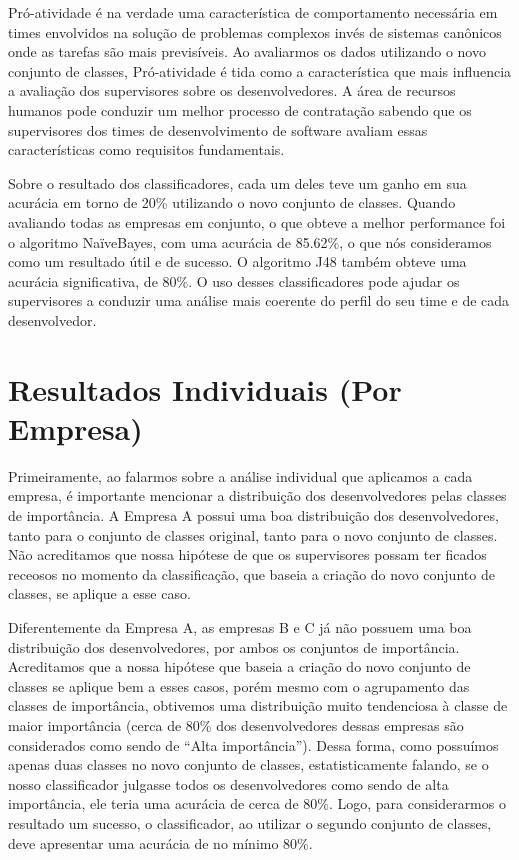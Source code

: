 Pró-atividade é na verdade uma característica de comportamento necessária em times envolvidos na solução de problemas complexos invés de sistemas canônicos onde as tarefas são mais previsíveis. Ao avaliarmos os dados utilizando o novo conjunto de classes, Pró-atividade é tida como a característica que mais influencia a avaliação dos supervisores sobre os desenvolvedores. A área de recursos humanos pode conduzir um melhor processo de contratação sabendo que os supervisores dos times de desenvolvimento de software avaliam essas características como requisitos fundamentais.

Sobre o resultado dos classificadores, cada um deles teve um ganho em sua acurácia em torno de 20\% utilizando o novo conjunto de classes. Quando avaliando todas as empresas em conjunto, o que obteve a melhor performance foi o algoritmo NaïveBayes, com uma acurácia de 85.62\%, o que nós consideramos como um resultado útil e de sucesso. O algoritmo J48 também obteve uma acurácia significativa, de 80\%. O uso desses classificadores pode ajudar os supervisores a conduzir uma análise mais coerente do perfil do seu time e de cada desenvolvedor.

\section{Resultados Individuais (Por Empresa)}
Primeiramente, ao falarmos sobre a análise individual que aplicamos a cada empresa, é importante mencionar a distribuição dos desenvolvedores pelas classes de importância. A Empresa A possui uma boa distribuição dos desenvolvedores, tanto para o conjunto de classes original, tanto para o novo conjunto de classes. Não acreditamos que nossa hipótese de que os supervisores possam ter ficados receosos no momento da classificação, que baseia a criação do novo conjunto de classes, se aplique a esse caso.

Diferentemente da Empresa A, as empresas B e C já não possuem uma boa distribuição dos desenvolvedores, por ambos os conjuntos de importância. Acreditamos que a nossa hipótese que baseia a criação do novo conjunto de classes se aplique bem a esses casos, porém mesmo com o agrupamento das classes de importância, obtivemos uma distribuição muito tendenciosa à classe de maior importância (cerca de 80\% dos desenvolvedores dessas empresas são considerados como sendo de “Alta importância”). Dessa forma, como possuímos apenas duas classes no novo conjunto de classes, estatisticamente falando, se o nosso classificador julgasse todos os desenvolvedores como sendo de alta importância, ele teria uma acurácia de cerca de 80\%. Logo, para considerarmos o resultado um sucesso, o classificador, ao utilizar o segundo conjunto de classes, deve apresentar uma acurácia de no mínimo 80\%.

